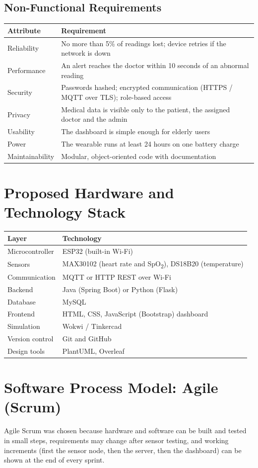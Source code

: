 \documentclass[12pt,a4paper]{article}
\begin{document}
\subsection{Non-Functional Requirements}
\begin{tabular}{@{}lp{11cm}@{}}
\toprule
\textbf{Attribute} & \textbf{Requirement}\\
\midrule
Reliability & No more than 5\% of readings lost; device retries if the network is down\\
Performance & An alert reaches the doctor within 10 seconds of an abnormal reading\\
Security & Passwords hashed; encrypted communication (HTTPS / MQTT over TLS); role-based access\\
Privacy & Medical data is visible only to the patient, the assigned doctor and the admin\\
Usability & The dashboard is simple enough for elderly users\\
Power & The wearable runs at least 24 hours on one battery charge\\
Maintainability & Modular, object-oriented code with documentation\\
\bottomrule
\end{tabular}

\section{Proposed Hardware and Technology Stack}
\begin{tabular}{@{}ll@{}}
\toprule
\textbf{Layer} & \textbf{Technology}\\
\midrule
Microcontroller & ESP32 (built-in Wi-Fi)\\
Sensors & MAX30102 (heart rate and SpO\textsubscript{2}), DS18B20 (temperature)\\
Communication & MQTT or HTTP REST over Wi-Fi\\
Backend & Java (Spring Boot) or Python (Flask)\\
Database & MySQL\\
Frontend & HTML, CSS, JavaScript (Bootstrap) dashboard\\
Simulation & Wokwi / Tinkercad\\
Version control & Git and GitHub\\
Design tools & PlantUML, Overleaf\\
\bottomrule
\end{tabular}

\section{Software Process Model: Agile (Scrum)}
Agile Scrum was chosen because hardware and software can be built and tested in small steps, requirements may change after sensor testing, and working increments (first the sensor node, then the server, then the dashboard) can be shown at the end of every sprint.
\end{document}
